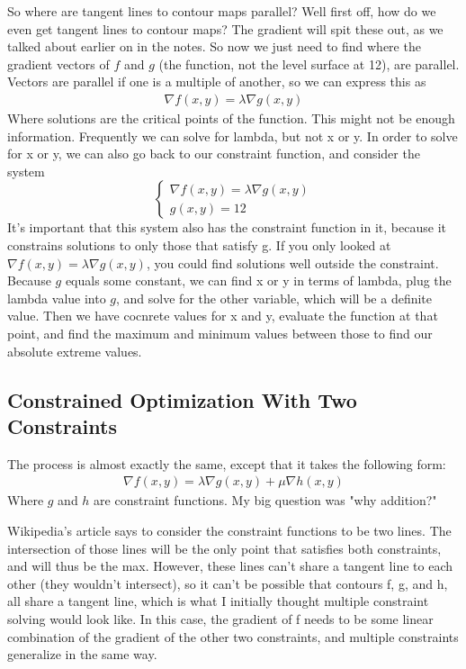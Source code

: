 \documentclass[12pt, letterpaper]{article}
\begin{document}
So where are tangent lines to contour maps parallel? 
Well first off, how do we even get tangent lines to contour maps?
The gradient will spit these out, as we talked about earlier on in the notes.
So now we just need to find where the gradient vectors of $f$ and $g$ (the function, not the level surface at 12), are parallel.
Vectors are parallel if one is a multiple of another, so we can express this as
\begin{gather*}
    \nabla f(x, y) = \lambda \nabla g(x, y)
\end{gather*}
Where solutions are the critical points of the function.
This might not be enough information.
Frequently we can solve for lambda, but not x or y.
In order to solve for x or y, we can also go back to our constraint function, and consider the system
\begin{displaymath}
    \begin{cases}
        \nabla f(x, y) = \lambda \nabla g(x, y) \\
        g(x, y) = 12
    \end{cases} 
\end{displaymath}
It's important that this system also has the constraint function in it, because it constrains solutions to only those that satisfy g.
If you only looked at $\nabla f(x, y) = \lambda \nabla g(x, y)$, you could find solutions well outside the constraint.
Because $g$ equals some constant, we can find x or y in terms of lambda, plug the lambda value into $g$, and solve for the other variable, which will be a definite value.
Then we have cocnrete values for x and y, evaluate the function at that point, and find the maximum and minimum values between those to find our absolute extreme values.

\subsection{Constrained Optimization With Two Constraints}
The process is almost exactly the same, except that it takes the following form:
\begin{gather*}
    \nabla f(x, y) = \lambda \nabla g(x, y) + \mu \nabla h(x, y)
\end{gather*}
Where $g$ and $h$ are constraint functions. My big question was "why addition?"

Wikipedia's article says to consider the constraint functions to be two lines.
The intersection of those lines will be the only point that satisfies both constraints, and will thus be the max.
However, these lines can't share a tangent line to each other (they wouldn't intersect), so it can't be possible that contours f, g, and h, all share a tangent line, which is what I initially thought multiple constraint solving would look like.
In this case, the gradient of f needs to be some linear combination of the gradient of the other two constraints, and multiple constraints generalize in the same way.
\end{document}
